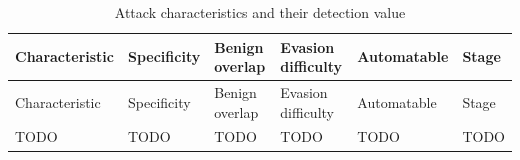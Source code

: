 \documentclass[
  a4paper,
  table]{article}
\begin{document}
\begin{longtable}[]{@{}
  >{\raggedright\arraybackslash}p{}
  >{\raggedright\arraybackslash}p{}
  >{\raggedright\arraybackslash}p{}
  >{\raggedright\arraybackslash}p{}
  >{\raggedright\arraybackslash}p{}
  >{\raggedright\arraybackslash}p{}@{}}
\caption{Attack characteristics and their detection
value}\label{tbl-characteristics}\tabularnewline
\toprule\noalign{}
\begin{minipage}[b]{\linewidth}\raggedright
Characteristic
\end{minipage} & \begin{minipage}[b]{\linewidth}\raggedright
Specificity
\end{minipage} & \begin{minipage}[b]{\linewidth}\raggedright
Benign overlap
\end{minipage} & \begin{minipage}[b]{\linewidth}\raggedright
Evasion difficulty
\end{minipage} & \begin{minipage}[b]{\linewidth}\raggedright
Automatable
\end{minipage} & \begin{minipage}[b]{\linewidth}\raggedright
Stage
\end{minipage} \\
\midrule\noalign{}
\endfirsthead
\toprule\noalign{}
\begin{minipage}[b]{\linewidth}\raggedright
Characteristic
\end{minipage} & \begin{minipage}[b]{\linewidth}\raggedright
Specificity
\end{minipage} & \begin{minipage}[b]{\linewidth}\raggedright
Benign overlap
\end{minipage} & \begin{minipage}[b]{\linewidth}\raggedright
Evasion difficulty
\end{minipage} & \begin{minipage}[b]{\linewidth}\raggedright
Automatable
\end{minipage} & \begin{minipage}[b]{\linewidth}\raggedright
Stage
\end{minipage} \\
\midrule\noalign{}
\endhead
\bottomrule\noalign{}
\endlastfoot
TODO & TODO & TODO & TODO & TODO & TODO \\
\end{longtable}
\end{document}
